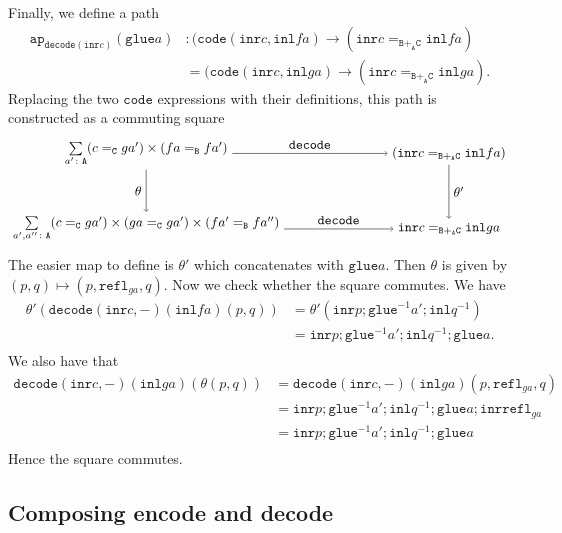 \documentclass[12pt]{amsart}
\newcommand{\inv}{^{-1}}
\newcommand{\type}[1]{\mathtt{#1}}
\newcommand{\tin}{\colon}
\newcommand{\A}{\type{A}}
\newcommand{\B}{\type{B}}
\newcommand{\C}{\type{C}}
\newcommand{\BAC}{\B +_{\A} \C}
\newcommand{\ap}{\type{ap}}
\newcommand{\inl}{\type{inl}}
\newcommand{\inr}{\type{inr}}
\newcommand{\glue}{\type{glue}}
\newcommand{\refl}{\type{refl}}
\newcommand{\code}{\type{code}}
\newcommand{\decode}{\type{decode}}
\theoremstyle{remark}
\theoremstyle{definition}
\begin{document}
Finally, we define a path
%
\begin{align*}
  \ap_{\decode ( \inr c )} (\glue a) & \tin
  ( \code ( \inr c , \inl fa ) \to ( \inr c =_{\BAC} \inl fa ) \\
  & =  ( \code ( \inr c , \inl ga ) \to ( \inr c =_{\BAC} \inl ga ).
\end{align*}
%
Replacing the two \( \code \) expressions with their definitions, this
path is constructed as a commuting square
\[
  \begin{tikzpicture}
    \node (1) at (-4,1)
      { \(
        \sum\limits_{a' \tin \A}
        ( c =_{\C} ga' ) \times ( fa =_{\B} fa' )
      \) }; 
    \node (2) at (-4,-1)
      { \(
        \sum\limits_{a',a'' \tin \A}
        ( c =_{\C} ga' ) \times ( ga =_{\C} ga' ) \times
        ( fa' =_{\B} fa'' )
      \) };
    \node (3) at (4,1)
      { \(
        ( \inr c =_{\BAC} \inl fa )
      \) };
    \node (4) at (4,-1)
      { \(
        \inr c =_{\BAC} \inl ga
      \) };
    \draw [->] (1) to node [left] {\( \theta \)} (2);
    \draw [->] (1) to node [above] {\( \decode \)} (3);
    \draw [->] (2) to node [above] {\( \decode \)} (4);
    \draw [->] (3) to node [right] {\( \theta' \)} (4); 
  \end{tikzpicture}
\]
The easier map to define is \( \theta' \) which  concatenates
with \( \glue a \).  Then \( \theta \) is given by
\(
  ( p,q ) \mapsto ( p, \refl_{ga} , q ).
\)
Now we check whether the square commutes. We have
%
\begin{align*}
  \theta' ( \decode ( \inr c , - ) ( \inl fa ) ( p,q ) )
  & = \theta' ( \inr p ; \glue^{-1} a' ; \inl q^{-1}  ) \\
  & = \inr p ; \glue^{-1} a' ; \inl q^{-1} ; \glue a. \\
\end{align*}
%
We also have that
%
\begin{align*}
  \decode ( \inr c , - ) ( \inl ga ) ( \theta ( p,q ) )
  & = \decode ( \inr c , - ) ( \inl ga ) ( p,\refl_{ga},q ) \\
  & =  \inr p ; \glue\inv a' ; \inl q\inv ; \glue a ; \inr \refl_{ga} \\
  & =  \inr p ; \glue\inv a' ; \inl q\inv ; \glue a  \\
\end{align*}
%
Hence the square commutes.


\subsection{Composing encode and decode}
\end{document}
